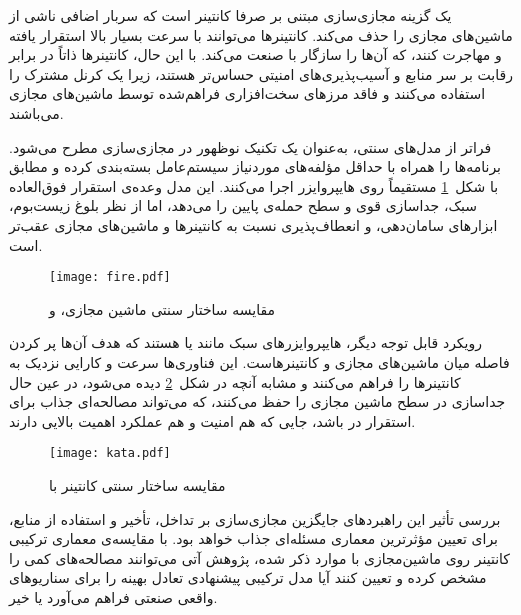 یک گزینه‌ مجازی‌سازی مبتنی بر صرفا کانتینر است که سربار اضافی ناشی از ماشین‌های مجازی را حذف می‌کند. کانتینرها می‌توانند با سرعت بسیار بالا استقرار یافته و مهاجرت کنند، که آن‌ها را سازگار با صنعت می‌کند. با این حال، کانتینرها ذاتاً در برابر رقابت بر سر منابع و آسیب‌پذیری‌های امنیتی حساس‌تر هستند، زیرا یک کرنل مشترک را استفاده می‌کنند و فاقد مرزهای سخت‌افزاری فراهم‌شده توسط ماشین‌های مجازی می‌باشند.

فراتر از مدل‌های سنتی،  به‌عنوان یک تکنیک نوظهور در مجازی‌سازی مطرح می‌شود.  برنامه‌ها را همراه با حداقل مؤلفه‌های موردنیاز سیستم‌عامل بسته‌بندی کرده و مطابق با شکل~\ref{figure:fireVuni} مستقیماً روی هایپروایزر اجرا می‌کنند\cite{firecracker2018}. این مدل وعده‌ی استقرار فوق‌العاده سبک، جداسازی قوی و سطح حمله‌ی پایین را می‌دهد، اما از نظر بلوغ زیست‌بوم، ابزارهای سامان‌دهی، و انعطاف‌پذیری نسبت به کانتینرها و ماشین‌های مجازی عقب‌تر است.

\vspace{0.5cm}
\begin{figure}[h]
\centering
\texttt{[image: fire.pdf]}
\caption{مقایسه ساختار سنتی ماشین مجازی،  و \cite{firecracker2018}}
\label{figure:fireVuni}
\end{figure}
\vspace{0.5cm}

رویکرد قابل توجه دیگر، هایپروایزرهای سبک مانند  یا  هستند که هدف آن‌ها پر کردن فاصله میان ماشین‌های مجازی و کانتینرهاست. این فناوری‌ها سرعت و کارایی نزدیک به کانتینرها را فراهم می‌کنند و مشابه آنچه در شکل~\ref{figure:containerVkata} دیده می‌شود، در عین حال جداسازی در سطح ماشین مجازی را حفظ می‌کنند\cite{kata2019}، که می‌تواند مصالحه‌ای جذاب برای استقرار در  باشد، جایی که هم امنیت و هم عملکرد اهمیت بالایی دارند.

\vspace{0.5cm}
\begin{figure}[h]
\centering
\texttt{[image: kata.pdf]}
\caption{مقایسه ساختار سنتی کانتینر با \cite{kata2019}}
\label{figure:containerVkata}
\end{figure}
\vspace{0.5cm}

بررسی تأثیر این راهبردهای جایگزین مجازی‌سازی بر تداخل، تأخیر و استفاده از منابع، برای تعیین مؤثرترین معماری مسئله‌ای جذاب خواهد بود. با مقایسه‌ی معماری ترکیبی کانتینر روی ماشین‌مجازی با موارد ذکر شده، پژوهش‌ آتی می‌توانند مصالحه‌های کمی را مشخص کرده و تعیین کنند آیا مدل ترکیبی پیشنهادی تعادل بهینه را برای سناریوهای واقعی صنعتی فراهم می‌آورد یا خیر.